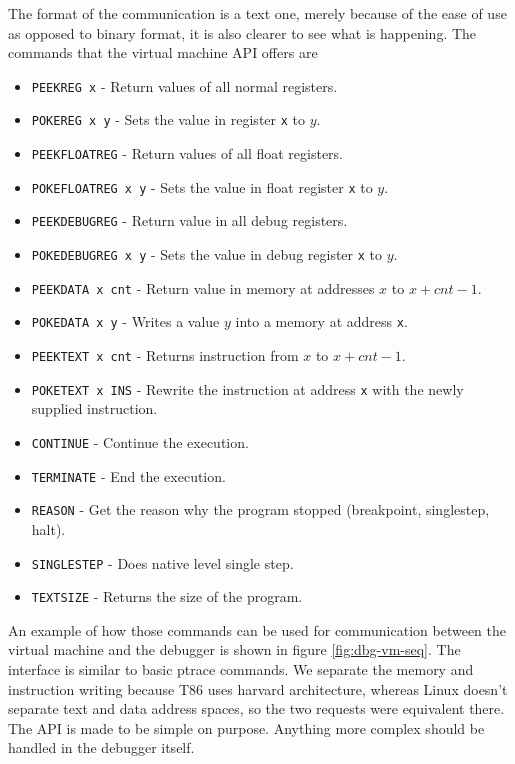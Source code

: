 The format of the communication is a text one, merely because of the ease
of use as opposed to binary format, it is also clearer to see what is
happening. The commands that the virtual machine API offers are
\begin{itemize}
    \item \texttt{PEEKREG x} - Return values of all normal registers.
    \item \texttt{POKEREG x y} - Sets the value in register \texttt{x} to
        $y$.
    \item \texttt{PEEKFLOATREG} - Return values of all float registers.
    \item \texttt{POKEFLOATREG x y} - Sets the value in float register
        \texttt{x} to $y$.
    \item \texttt{PEEKDEBUGREG} - Return value in all debug registers.
    \item \texttt{POKEDEBUGREG x y} - Sets the value in debug register
        \texttt{x} to $y$.
    \item \texttt{PEEKDATA x cnt} - Return value in memory at addresses $x$ to $x + cnt - 1$.
    \item \texttt{POKEDATA x y} - Writes a value $y$ into a memory at
        address \texttt{x}.
    \item \texttt{PEEKTEXT x cnt} - Returns instruction from $x$ to $x + cnt - 1$.
    \item \texttt{POKETEXT x INS} - Rewrite the instruction at address
        \texttt{x} with the newly supplied instruction.
    \item \texttt{CONTINUE} - Continue the execution.
    \item \texttt{TERMINATE} - End the execution.
    \item \texttt{REASON} - Get the reason why the program stopped (breakpoint,
        singlestep, halt).
    \item \texttt{SINGLESTEP} - Does native level single step.
    \item \texttt{TEXTSIZE} - Returns the size of the program.
\end{itemize}
An example of how those commands can be used for communication between the virtual
machine and the debugger is shown in figure \ref{fig:dbg-vm-seq}. The interface
is similar to basic ptrace commands. We separate the memory and instruction
writing because T86 uses harvard architecture, whereas Linux doesn't separate
text and data address spaces\cite{ptrace}, so the two requests were equivalent
there. The API is made to be simple on purpose. Anything more complex should
be handled in the debugger itself.

